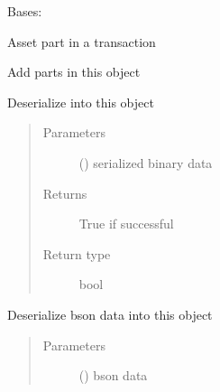 \documentclass[letterpaper,10pt,english]{sphinxmanual}
\begin{document}
\begin{fulllineitems}
\label{\detokenize{bbc1.core.bbclib:bbc1.core.bbclib.BBcAsset}}
Bases: 

Asset part in a transaction

\begin{fulllineitems}
\label{\detokenize{bbc1.core.bbclib:bbc1.core.bbclib.BBcAsset.add}}
Add parts in this object

\end{fulllineitems}


\begin{fulllineitems}
\label{\detokenize{bbc1.core.bbclib:bbc1.core.bbclib.BBcAsset.deserialize}}
Deserialize into this object
\begin{quote}\begin{description}
\item[{Parameters}] \leavevmode
{} () \textendash{} serialized binary data

\item[{Returns}] \leavevmode
True if successful

\item[{Return type}] \leavevmode
bool

\end{description}\end{quote}

\end{fulllineitems}


\begin{fulllineitems}
\label{\detokenize{bbc1.core.bbclib:bbc1.core.bbclib.BBcAsset.deserialize_bson}}
Deserialize bson data into this object
\begin{quote}\begin{description}
\item[{Parameters}] \leavevmode
{} () \textendash{} bson data


\end{description}
\end{quote}
\end{fulllineitems}
\end{fulllineitems}
\end{document}
